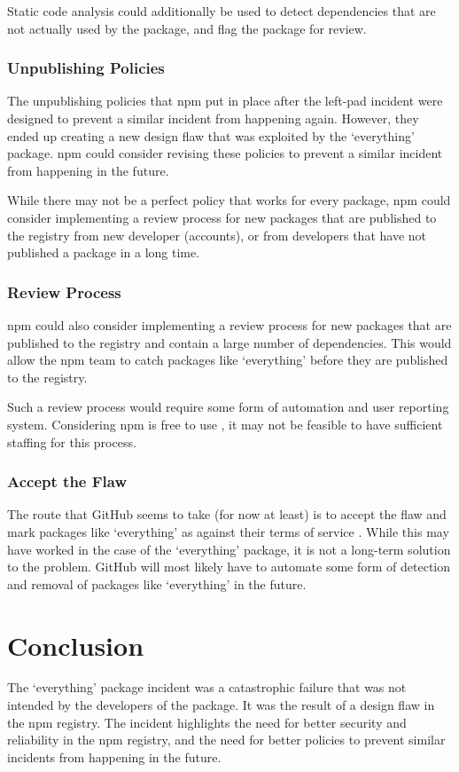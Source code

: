 \documentclass[acmsmall]{acmart}
\begin{document}
Static code analysis could additionally be used to detect dependencies that are
not actually used by the package, and flag the package for review.

\subsubsection{Unpublishing Policies}
The unpublishing policies that npm put in place after the left-pad incident were
designed to prevent a similar incident from happening again. However, they ended
up creating a new design flaw that was exploited by the `everything' package.
npm could consider revising these policies to prevent a similar incident from
happening in the future.

While there may not be a perfect policy that works for every package, npm could
consider implementing a review process for new packages that are published to
the registry from new developer (accounts), or from developers that have not
published a package in a long time.

\subsubsection{Review Process}
npm could also consider implementing a review process for new packages that are
published to the registry and contain a large number of dependencies. This would
allow the npm team to catch packages like `everything' before they are published
to the registry.

Such a review process would require some form of automation and user reporting
system. Considering npm is free to use \cite{npm-tos}, it may not be feasible to
have sufficient staffing for this process.

\subsubsection{Accept the Flaw}
The route that GitHub seems to take (for now at least) is to accept the flaw and
mark packages like `everything' as against their terms of service
\cite{uncenter-blog-everything}. While this may have worked in the case of the
`everything' package, it is not a long-term solution to the problem. GitHub will
most likely have to automate some form of detection and removal of packages like
`everything' in the future.

\section{Conclusion}
The `everything' package incident was a catastrophic failure that was not
intended by the developers of the package. It was the result of a design flaw in
the npm registry. The incident highlights the need for better security and
reliability in the npm registry, and the need for better policies to prevent
similar incidents from happening in the future.
\end{document}
